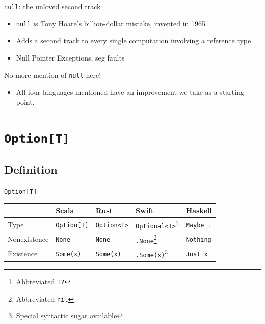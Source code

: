 \begin{frame}{\texttt{null}: the unloved second track}
  \begin{itemize}
  \item \texttt{null} is
    \href{http://www.infoq.com/presentations/Null-References-The-Billion-Dollar-Mistake-Tony-Hoare}{Tony Hoare's billion-dollar mistake}, invented in 1965
  \item Adds a second track to every single computation involving a
    reference type
  \item Null Pointer Exceptions, seg faults
  \end{itemize}

  No more mention of \texttt{null} here!
  \begin{itemize}
  \item All four languages mentioned have an improvement we take as a
    starting point.
  \end{itemize}
\end{frame}

\section{\texttt{Option[T]}}

\subsection{Definition}

\begin{frame}{\texttt{Option[T]}}
  \begin{table}
    \begin{tabular}{| l | l | l | l | l |}
      \toprule
      & Scala & Rust & Swift & Haskell \\
      \midrule
      Type & \href{http://www.scala-lang.org/api/current/index.html\#scala.Option}{\texttt{Option[T]}} &
        \href{http://doc.rust-lang.org/1.0.0-beta/std/option/enum.Option.html}{\texttt{Option<T>}} &
        \href{https://developer.apple.com/library/ios/documentation/Swift/Conceptual/Swift_Programming_Language/Types.html\#//apple_ref/doc/uid/TP40014097-CH31-ID452}{\texttt{Optional<T>}}\footnote{Abbreviated \texttt{T?}} &
        \href{http://hackage.haskell.org/package/base-4.8.0.0/docs/Data-Maybe.html}{\texttt{Maybe t}} \\
      \midrule
      Nonexistence & \texttt{None} &
        \texttt{None} &
        \texttt{.None}\footnote{Abbreviated \texttt{nil}} &
        \texttt{Nothing} \\
      Existence & \texttt{Some(x)} &
        \texttt{Some(x)} &
        \texttt{.Some(x)}\footnote{Special syntactic sugar available} &
        \texttt{Just x} \\
      \bottomrule
    \end{tabular}
  \end{table}
\end{frame}

